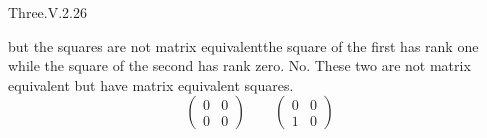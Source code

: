 \begin{ans}{Three.V.2.26}
\begin{exparts}
\begin{equation*}
          \end{equation*}
          but the squares are not matrix equivalent\Dash the square of the
          first has rank one while the square of the second has rank zero.
        \partsitem No.
          These two are not matrix equivalent but have matrix equivalent
          squares.
          \begin{equation*}
             \begin{pmatrix}
               0  &0  \\
               0  &0
             \end{pmatrix}
             \qquad
             \begin{pmatrix}
               0  &0  \\
               1  &0
             \end{pmatrix}
          \end{equation*}
      \end{exparts}
    
\end{ans}

